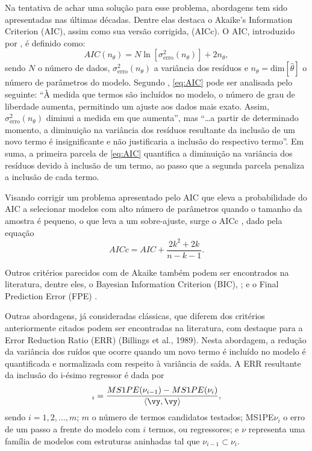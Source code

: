 Na tentativa de achar uma solução para esse problema, abordagens tem sido apresentadas nas últimas décadas.
Dentre elas destaca o Akaike’s Information Criterion (AIC), assim como sua versão corrigida, (AICc).
O AIC, introduzido por \cite{akaike1974}, é definido como:
\begin{equation}
    AIC(n_\theta) = N \ln[\sigma^2_{\text{erro}}(n_\theta)] + 2 n _\theta
\label{eq:AIC},
\end{equation}
sendo $N$ o número de dados, $\sigma^2_{\text{erro}}(n_\theta)$ a variância dos resíduos e $n_\theta = \text{dim}[\hat {\theta}]$ o número de parâmetros do modelo.
Segundo \cite{aguirre2015}, \eqref{eq:AIC} pode ser analisada pelo seguinte: ``À medida que termos são incluídos no modelo, o número de grau de liberdade aumenta, permitindo um ajuste aos dados mais exato. Assim, $\sigma^2_{\text{erro}}(n_\theta)$ diminui a medida em que  aumenta'',
mas ``\dots a partir de determinado momento, a diminuição na variância dos resíduos resultante da inclusão de um novo termo é insignificante e não justificaria a inclusão do respectivo termo''.
Em suma, a primeira parcela de \eqref{eq:AIC} quantifica a diminuição na variância dos resíduos devido à inclusão de um termo, ao passo que a segunda parcela  penaliza a inclusão de cada termo. 

Visando corrigir um problema apresentado pelo AIC que eleva a probabilidade do AIC a selecionar modelos com alto número de parâmetros quando o tamanho da amostra é pequeno, o que leva a um sobre-ajuste, surge o AICc \citep{cavanaugh1997}, dado pela equação
\begin{equation}
    AICc = AIC + \frac{2k^2+2k}{n-k-1}
\label{eq:AICc}.
\end{equation}

Outros critérios parecidos com de Akaike também podem ser encontrados na literatura, dentre eles, o Bayesian Information Criterion (BIC), \citep{schwarz1978}; e o Final Prediction Error (FPE) \citep{kashyap1977}.

Outras abordagens, já consideradas clássicas, que diferem dos critérios anteriormente citados podem ser encontradas na literatura, com destaque para a Error Reduction Ratio (ERR) (Billings et al., 1989).
Nesta abordagem, a redução da variância  dos ruídos que ocorre quando um novo termo é incluído no modelo é quantificada e normalizada com respeito à variância de saída.
A ERR resultante da inclusão do i-ésimo regressor é dada por
\begin{equation}
    [\text{ERR}]_i  = \frac{MS1PE(\nu_{i-1})-MS1PE(\nu_i)}{\langle\vy,\vy\rangle}
\label{eq:ERR},
\end{equation}
sendo $i = 1, 2, \dots, m$; $m$ o número de termos candidatos testados;  MS1PE$\nu_i$ o erro de  um passo a frente do modelo com $i$ termos, ou regressores; e $\nu$ representa uma família de modelos com estruturas aninhadas tal que $\nu_{i-1} \subset \nu_i$.

